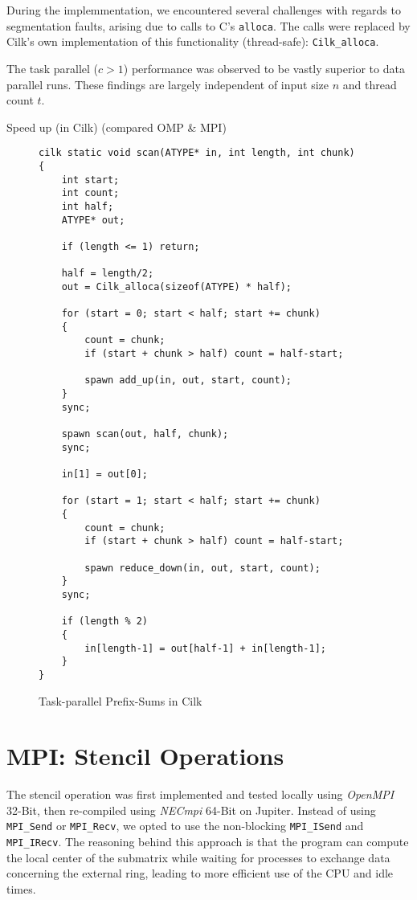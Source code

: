 \documentclass[11pt]{article}
\begin{document}
During the implemmentation, we encountered several challenges with regards to segmentation faults, arising due to calls to C's \verb=alloca=. The calls were replaced by Cilk's own implementation of this functionality (thread-safe): \verb=Cilk_alloca=.

The task parallel ($c > 1$) performance was observed to be vastly superior to data parallel runs. These findings are largely independent of input size $n$ and thread count $t$.

Speed up (in Cilk) (compared OMP \& MPI)



\begin{figure}
\label{cilk_prefix_code}
\caption{Task-parallel Prefix-Sums in Cilk}
\begin{lstlisting}
cilk static void scan(ATYPE* in, int length, int chunk)
{
	int start;
	int count;
	int half;
	ATYPE* out;

	if (length <= 1) return;

	half = length/2;
	out = Cilk_alloca(sizeof(ATYPE) * half);

	for (start = 0; start < half; start += chunk) 
	{
		count = chunk;
		if (start + chunk > half) count = half-start;

		spawn add_up(in, out, start, count);
	}
	sync;

	spawn scan(out, half, chunk);
	sync;

	in[1] = out[0];

	for (start = 1; start < half; start += chunk) 
	{
		count = chunk;
		if (start + chunk > half) count = half-start;

		spawn reduce_down(in, out, start, count);
	}
	sync;

	if (length % 2)
	{
		in[length-1] = out[half-1] + in[length-1];
	}
}
\end{lstlisting}

\end{figure}

\section{MPI: Stencil Operations}
The stencil operation was first implemented and tested locally using \emph{OpenMPI} 32-Bit, then re-compiled using \emph{NECmpi} 64-Bit on Jupiter. Instead of using \verb=MPI_Send= or \verb=MPI_Recv=, we opted to use the non-blocking \verb=MPI_ISend= and \verb=MPI_IRecv=. The reasoning behind this approach is that the program can compute the local center of the submatrix while waiting for processes to exchange data concerning the external ring, leading to more efficient use of the CPU and idle times.
\end{document}
